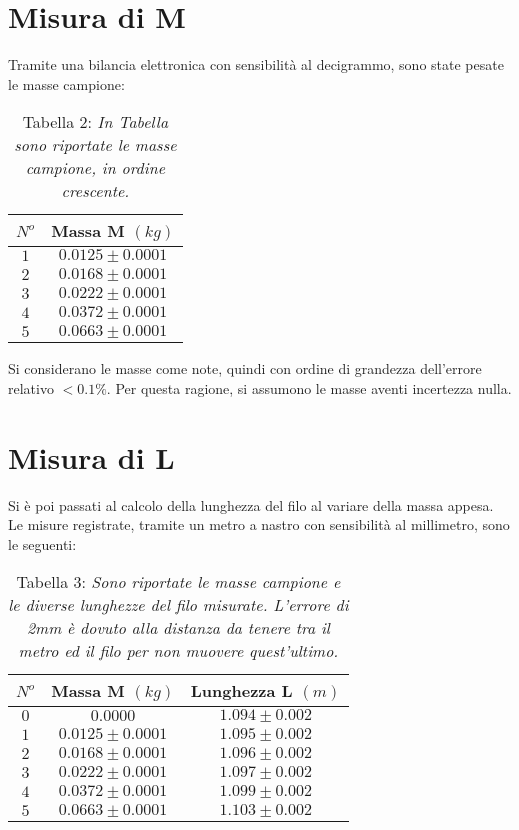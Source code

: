\documentclass[12pt, a4paper]{article}
\begin{document}
\section{Misura di M}
Tramite una bilancia elettronica con sensibilità al decigrammo, sono state pesate le masse campione:

\begin{table}[!htb]
    \centering
        \begin{tabular}{|c|c|}
            \hline
            $N^o$ &Massa M $(kg)$\\
            \hline
            $1$ & $0.0125\pm0.0001$\\
            $2$ & $0.0168\pm0.0001$\\
            $3$ & $0.0222\pm0.0001$\\
            $4$ & $0.0372\pm0.0001$\\
            $5$ & $0.0663\pm0.0001$\\
            \hline
        \end{tabular}
        \label{Tab masse}
        \caption*{Tabella 2: \textit{\footnotesize In Tabella sono riportate le masse campione, in ordine crescente.}}
        \end{table}

    Si considerano le masse come note, quindi con ordine di grandezza dell'errore relativo $<0.1\%$. Per questa ragione, si assumono le masse aventi incertezza nulla.



    
\section{Misura di L}
\label{Misura di L}
Si è poi passati al calcolo della lunghezza del filo al variare della massa appesa. Le misure registrate, tramite un metro a nastro con sensibilità al millimetro, sono le seguenti:

\begin{table}[!htb]
    \centering
        \begin{tabular}{|c|c|c|}
            \hline
            $N^o$ &Massa M $(kg)$&Lunghezza L $(m)$\\
            \hline
            $0$ & $0.0000$         &$1.094\pm0.002$\\
            $1$ & $0.0125\pm0.0001$&$1.095\pm0.002$\\
            $2$ & $0.0168\pm0.0001$&$1.096\pm0.002$\\
            $3$ & $0.0222\pm0.0001$&$1.097\pm0.002$\\
            $4$ & $0.0372\pm0.0001$&$1.099\pm0.002$\\
            $5$ & $0.0663\pm0.0001$&$1.103\pm0.002$\\
           
            \hline
        \end{tabular}
        \label{Tab Lunghezze}
        \caption*{\centering Tabella 3: \textit{\footnotesize Sono riportate le masse campione e le diverse lunghezze del filo misurate. L'errore di 2mm è dovuto alla distanza da tenere tra il metro ed il filo per non muovere quest'ultimo.}}
        \end{table}
\end{document}
